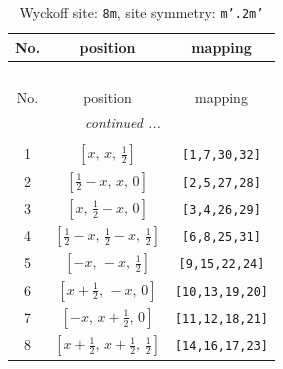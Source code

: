\documentclass[fleqn,8pt]{jsarticle}
\begin{document}
\begin{longtable}{ccc}
\caption{Wyckoff site: {\tt 8m}, site symmetry: {\tt m'.2m'}}
 \\
 \hline \hline
No. & position & mapping \\ \hline \endfirsthead

\multicolumn{2}{l}{\tablename\ \thetable{}} \\
 \hline \hline
No. & position & mapping \\ \hline \endhead

 \hline \hline
\multicolumn{2}{r}{\footnotesize\it continued ...} \\ \endfoot

 \hline \hline
\multicolumn{2}{r}{} \\ \endlastfoot

1 & $\left[ x,\, x,\, \frac{1}{2} \right]$ & {\tt [1,7,30,32]} \\ \hline
2 & $\left[ \frac{1}{2} - x,\, x,\, 0 \right]$ & {\tt [2,5,27,28]} \\ \hline
3 & $\left[ x,\, \frac{1}{2} - x,\, 0 \right]$ & {\tt [3,4,26,29]} \\ \hline
4 & $\left[ \frac{1}{2} - x,\, \frac{1}{2} - x,\, \frac{1}{2} \right]$ & {\tt [6,8,25,31]} \\ \hline
5 & $\left[ - x,\, - x,\, \frac{1}{2} \right]$ & {\tt [9,15,22,24]} \\ \hline
6 & $\left[ x + \frac{1}{2},\, - x,\, 0 \right]$ & {\tt [10,13,19,20]} \\ \hline
7 & $\left[ - x,\, x + \frac{1}{2},\, 0 \right]$ & {\tt [11,12,18,21]} \\ \hline
8 & $\left[ x + \frac{1}{2},\, x + \frac{1}{2},\, \frac{1}{2} \right]$ & {\tt [14,16,17,23]} \\
\end{longtable}
\renewcommand{\arraystretch}{1.2}
\end{document}
